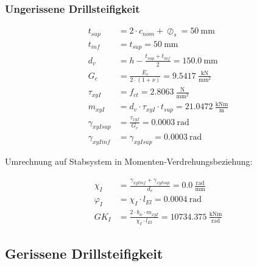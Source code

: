 \documentclass[
  11pt,
  letterpaper,
]{scrreprt}
\begin{document}
\subsubsection{Ungerissene
Drillsteifigkeit}\label{ungerissene-drillsteifigkeit}

\[
\begin{aligned}
t_{sup}& = 2 \cdot c_{nom} + \oslash_{s} = 50 \ \mathrm{mm} \\ 
t_{inf}& = t_{sup} = 50 \ \mathrm{mm} \\ 
d_{v}& = h - \frac{t_{sup} + t_{inf}}{2} = 150.0 \ \mathrm{mm} \\ 
G_{c}& = \frac{E_{c}}{2 \cdot \left(1 + \nu\right)} = 9.5417 \ \frac{\mathrm{kN}}{\mathrm{mm}^{2}} \\ 
\tau_{xy I}& = f_{ct} = 2.8063 \ \frac{\mathrm{N}}{\mathrm{mm}^{2}} \\ 
m_{xy I}& = d_{v} \cdot \tau_{xy I} \cdot t_{sup} = 21.0472 \ \frac{\mathrm{kNm}}{\mathrm{m}} \\ 
\gamma_{xy I sup}& = \frac{\tau_{xy I}}{G_{c}} = 0.0003 \ \mathrm{rad} \\ 
\gamma_{xy I inf}& = \gamma_{xy I sup} = 0.0003 \ \mathrm{rad} \end{aligned}
\]

Umrechnung auf Stabsystem in Momenten-Verdrehungsbeziehung:

\[
\begin{aligned}
\chi_{I}& = \frac{\gamma_{xy I inf} + \gamma_{xy I sup}}{d_{v}} = 0.0 \ \frac{\mathrm{rad}}{\mathrm{mm}} \\ 
\varphi_{I}& = \chi_{I} \cdot l_{El} = 0.0004 \ \mathrm{rad} \\ 
GK_{I}& = \frac{2 \cdot b_{w} \cdot m_{xy I}}{\chi_{I} \cdot l_{El}} = 10734.375 \ \frac{\mathrm{kNm}}{\mathrm{rad}} \end{aligned}
\]

\subsection{Gerissene
Drillsteifigkeit}\label{gerissene-drillsteifigkeit}
\end{document}
